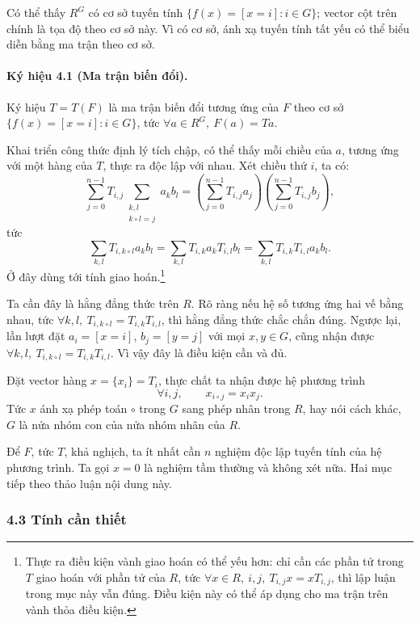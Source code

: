 \documentclass[11pt]{article}
\begin{document}
Có thể thấy \(R^G\) có cơ sở tuyến tính \(\{f(x)=[x=i]:i\in G\}\); vector cột
trên chính là tọa độ theo cơ sở này. Vì có cơ sở, ánh xạ tuyến tính tất yếu có
thể biểu diễn bằng ma trận theo cơ sở.

\paragraph{Ký hiệu 4.1 (Ma trận biến đổi).}
Ký hiệu \(T=T(F)\) là ma trận biến đổi tương ứng của \(F\) theo cơ sở
\(\{f(x)=[x=i]:i\in G\}\), tức \(\forall a\in R^G,\ F(a)=Ta\).

Khai triển công thức định lý tích chập, có thể thấy mỗi chiều của \(a\), tương
ứng với một hàng của \(T\), thực ra độc lập với nhau. Xét chiều thứ \(i\), ta
có:
\[
\sum_{j=0}^{n-1} T_{i,j}\sum_{\substack{k,l\\k\circ l=j}}a_kb_l
=
\left(\sum_{j=0}^{n-1}T_{i,j}a_j\right)
\left(\sum_{j=0}^{n-1}T_{i,j}b_j\right),
\]
tức
\[
  \sum_{k,l}T_{i,k\circ l}a_kb_l
  =
  \sum_{k,l}T_{i,k}a_kT_{i,l}b_l
  =
  \sum_{k,l}T_{i,k}T_{i,l}a_kb_l. \tag{15}
\]
Ở đây dùng tới tính giao hoán.\footnote{Thực ra điều kiện vành giao hoán có thể
yếu hơn: chỉ cần các phần tử trong \(T\) giao hoán với phần tử của \(R\), tức
\(\forall x\in R,\ i,j,\ T_{i,j}x=xT_{i,j}\), thì lập luận trong mục này vẫn
đúng. Điều kiện này có thể áp dụng cho ma trận trên vành thỏa điều kiện.}

Ta cần đây là hằng đẳng thức trên \(R\). Rõ ràng nếu hệ số tương ứng hai vế bằng
nhau, tức \(\forall k,l,\ T_{i,k\circ l}=T_{i,k}T_{i,l}\), thì hằng đẳng thức
chắc chắn đúng. Ngược lại, lần lượt đặt \(a_i=[x=i]\), \(b_j=[y=j]\) với mọi
\(x,y\in G\), cũng nhận được \(\forall k,l,\ T_{i,k\circ l}=T_{i,k}T_{i,l}\).
Vì vậy đây là điều kiện cần và đủ.

Đặt vector hàng \(x=\{x_i\}=T_i\), thực chất ta nhận được hệ phương trình
\[
  \forall i,j,\qquad x_{i\circ j}=x_ix_j.
\]
Tức \(x\) ánh xạ phép toán \(\circ\) trong \(G\) sang phép nhân trong \(R\), hay
nói cách khác, \(G\) là nửa nhóm con của nửa nhóm nhân của \(R\).

Để \(F\), tức \(T\), khả nghịch, ta ít nhất cần \(n\) nghiệm độc lập tuyến tính
của hệ phương trình. Ta gọi \(x=0\) là nghiệm tầm thường và không xét nữa. Hai
mục tiếp theo thảo luận nội dung này.

\subsubsection*{4.3 Tính cần thiết}
\end{document}
